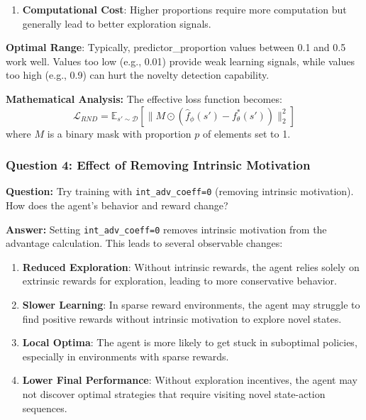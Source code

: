 \documentclass[12pt]{article}
\begin{document}
{{{\begin{enumerate}
    \item \textbf{Computational Cost}: Higher proportions require more computation but generally lead to better exploration signals.
\end{enumerate}

\textbf{Optimal Range}: Typically, predictor\_proportion values between 0.1 and 0.5 work well. Values too low (e.g., 0.01) provide weak learning signals, while values too high (e.g., 0.9) can hurt the novelty detection capability.

\textbf{Mathematical Analysis:} The effective loss function becomes:
\begin{equation}
\mathcal{L}_{RND} = \mathbb{E}_{s' \sim \mathcal{D}} \left[ \|M \odot (\hat{f}_\phi(s') - f^*_\theta(s'))\|_2^2 \right]
\end{equation}
where $M$ is a binary mask with proportion $p$ of elements set to 1.
    
\subsubsection{Question 4: Effect of Removing Intrinsic Motivation}

\textbf{Question:} Try training with \texttt{int\_adv\_coeff=0} (removing intrinsic motivation). How does the agent's behavior and reward change?

\textbf{Answer:} Setting \texttt{int\_adv\_coeff=0} removes intrinsic motivation from the advantage calculation. This leads to several observable changes:

\begin{enumerate}
    \item \textbf{Reduced Exploration}: Without intrinsic rewards, the agent relies solely on extrinsic rewards for exploration, leading to more conservative behavior.
    
    \item \textbf{Slower Learning}: In sparse reward environments, the agent may struggle to find positive rewards without intrinsic motivation to explore novel states.
    
    \item \textbf{Local Optima}: The agent is more likely to get stuck in suboptimal policies, especially in environments with sparse rewards.
    
    \item \textbf{Lower Final Performance}: Without exploration incentives, the agent may not discover optimal strategies that require visiting novel state-action sequences.
    

\end{enumerate}}}}
\end{document}

